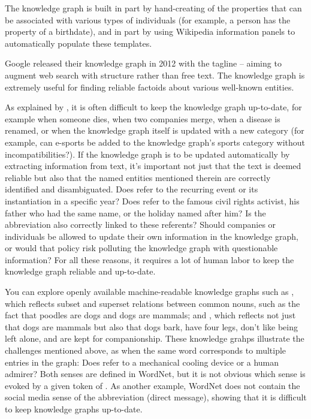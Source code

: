 The knowledge graph is built in part by hand-creating  of the properties that can be associated with various types of individuals (for example, a person has the property of a birthdate), and in part by using Wikipedia information panels to automatically populate these templates.  

Google released their knowledge graph in 2012 with the tagline  -- aiming to augment web search with structure rather than free text.  The knowledge graph is extremely useful for finding reliable factoids about various well-known entities.  


As explained by \citet{Peng-etal:2023}, it is often difficult to keep the knowledge graph up-to-date, for example when someone dies, when two companies merge, when a disease is renamed, or when the knowledge graph itself is updated with a new category (for example, can e-sports be added to the knowledge graph's sports category without incompatibilities?).  If the knowledge graph is to be updated automatically by extracting information from text, it's important not just that the text is deemed reliable but also that the named entities mentioned therein are correctly identified and disambiguated. Does  refer to the recurring event or its instantiation in a specific year?  Does  refer to the famous civil rights activist, his father who had the same name, or the holiday named after him? Is the abbreviation  also correctly linked to these referents?  Should companies or individuals be allowed to update their own information in the knowledge graph, or would that policy risk polluting the knowledge graph with questionable information?  For all these reasons, it requires a lot of human labor to keep the knowledge graph reliable and up-to-date.


You can explore openly available machine-readable knowledge graphs such as   \citep{fellbaum:98}, which reflects subset and superset relations between common nouns, such as the fact that poodles are dogs and dogs are mammals; and  \citep{Speer-etal:2017}, which reflects not just that dogs are mammals but also that dogs bark, have four legs, don't like being left alone, and are kept for companionship.  These knowledge grahps illustrate the challenges mentioned above, as when the same word corresponds to multiple entries in the graph: Does  refer to a mechanical cooling device or a human admirer? Both senses are defined in WordNet, but it is not obvious which sense is evoked by a given token of .  As another example, WordNet does not contain the social media sense of the abbreviation  (direct message), showing that it is difficult to keep knowledge graphs up-to-date.
 

